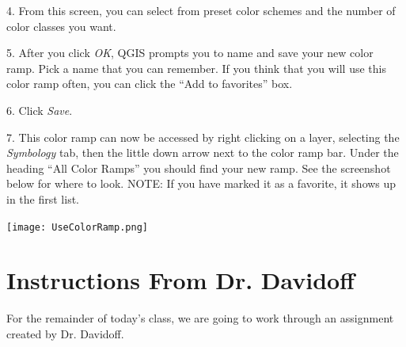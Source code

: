 \documentclass[oneside,a4paper,11pt,explicit]{book}
\begin{document}
\vspace{.5em}

4. From this screen, you can select from preset color schemes and the number of color classes you want.

5. After you click \textit{OK}, QGIS prompts you to name and save your new color ramp. Pick a name that you can remember. If you think that you will use this color ramp often, you can click the ``Add to favorites'' box. 

6. Click \textit{Save}.

7. This color ramp can now be accessed by right clicking on a layer, selecting the \textit{Symbology} tab, then the little down arrow next to the color ramp bar. Under the heading ``All Color Ramps'' you should find your new ramp. See the screenshot below for where to look. NOTE: If you have marked it as a favorite, it shows up in the first list. 

\centerline{\texttt{[image: UseColorRamp.png]}}

\vspace{.5em}

\section{Instructions From Dr. Davidoff}

For the remainder of today's class, we are going to work through an assignment created by Dr. Davidoff.
\end{document}

